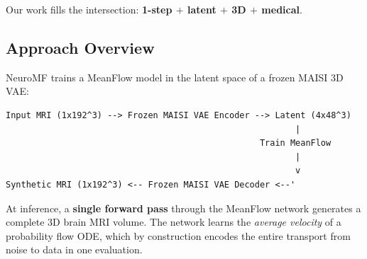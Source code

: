 Our work fills the intersection: \textbf{1-step $+$ latent $+$ 3D $+$ medical}.

\subsection{Approach Overview}

NeuroMF trains a MeanFlow model in the latent space of a frozen MAISI 3D VAE:
\begin{center}
\begin{BVerbatim}
Input MRI (1x192^3) --> Frozen MAISI VAE Encoder --> Latent (4x48^3)
                                                         |
                                                  Train MeanFlow
                                                         |
                                                         v
Synthetic MRI (1x192^3) <-- Frozen MAISI VAE Decoder <--'
\end{BVerbatim}
\end{center}

At inference, a \textbf{single forward pass} through the MeanFlow network
generates a complete 3D brain MRI volume.  The network learns the
\emph{average velocity} of a probability flow ODE, which by construction
encodes the entire transport from noise to data in one evaluation.